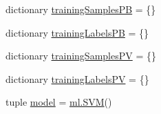\begin{DoxyCompactItemize}
dictionary \hyperlink{namespacetrain-object-classification_aa63e452b413750b1a2b7937339ac1d49}{training\-Samples\-P\-B} = \{\}
\item 
dictionary \hyperlink{namespacetrain-object-classification_aef8b43602eb95d856f8e5ca31bd77473}{training\-Labels\-P\-B} = \{\}
\item 
dictionary \hyperlink{namespacetrain-object-classification_a0f1db4b15cd5640a02d76f4940b82080}{training\-Samples\-P\-V} = \{\}
\item 
dictionary \hyperlink{namespacetrain-object-classification_a26307da540e6600d0314876308f6d9f0}{training\-Labels\-P\-V} = \{\}
\item 
tuple \hyperlink{namespacetrain-object-classification_a2460fc9486a03f588e9583a3d4969607}{model} = \hyperlink{classml_1_1SVM}{ml.\-S\-V\-M}()
\end{DoxyCompactItemize}


